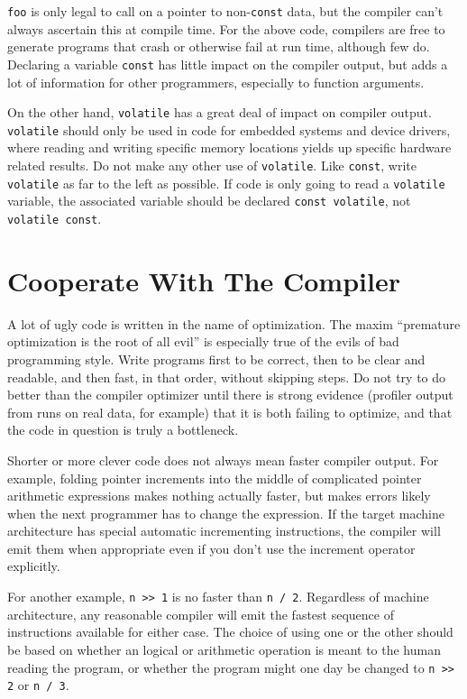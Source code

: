 \documentclass{lulu}
\newcommand{\code}[1]{\texttt{#1}\xspace}
\newcommand{\heading}[1]{\markboth{\textup{\thechapter\ -- #1}}{}}
\begin{document}
\code{foo} is only legal to call on a pointer to non-\code{const}
data, but the compiler can't always ascertain this at compile time.
For the above code, compilers are free to generate programs that crash
or otherwise fail at run time, although few do.  Declaring a variable
\code{const} has little impact on the compiler output, but adds a lot
of information for other programmers, especially to function
arguments.

On the other hand, \code{volatile} has a great deal of impact on
compiler output.  \code{volatile} should only be used in code for
embedded systems and device drivers, where reading and writing
specific memory locations yields up specific hardware related results.
Do not make any other use of \code{volatile}.  Like \code{const},
write \code{volatile} as far to the left as possible.  If code is only
going to read a \code{volatile} variable, the associated variable
should be declared \code{const volatile}, not \code{volatile const}.

\chapter{Cooperate With The Compiler}
\heading{Cooperate With The Compiler}

A lot of ugly code is written in the name of optimization.  The maxim
``premature optimization is the root of all evil'' is especially true
of the evils of bad programming style.  Write programs first to be
correct, then to be clear and readable, and then fast, in that order,
without skipping steps.  Do not try to do better than the compiler
optimizer until there is strong evidence (profiler output from runs on
real data, for example) that it is both failing to optimize, and that
the code in question is truly a bottleneck.

Shorter or more clever code does not always mean faster compiler
output.  For example, folding pointer increments into the middle of
complicated pointer arithmetic expressions makes nothing actually
faster, but makes errors likely when the next programmer has to change
the expression.  If the target machine architecture has special
automatic incrementing instructions, the compiler will emit them when
appropriate even if you don't use the increment operator explicitly.

For another example, \code{n >> 1} is no faster than \code{n / 2}.
Regardless of machine architecture, any reasonable compiler will emit
the fastest sequence of instructions available for either case.  The
choice of using one or the other should be based on whether an logical
or arithmetic operation is meant to the human reading the program, or
whether the program might one day be changed to \code{n >> 2} or
\code{n / 3}.
\end{document}
